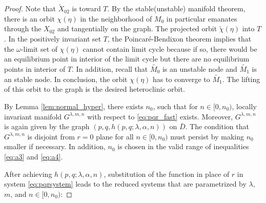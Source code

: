 \documentclass[a4paper,11pt]{article}
\begin{document}
\begin{proof}





Note that $\tilde{X}_{02}$ is toward $T$. By the stable(unstable) manifold theorem, there is an orbit $\chi(\eta)$ in the neighborhood of $M_0$ in particular emanates through the ${X}_{02}$ and tangentially on the graph. The projected orbit $\tilde{\chi}(\eta)$ into $T$. In the positively invariant set $T$, the Poincar\'e-Bendixon theorem implies that the $\omega$-limit set of $\chi(\eta)$ cannot contain limit cycle because if so, there would be an equilibrium point in interior of the limit cycle but there are no equilibrium points in interior of $T$. In addition, recall that $\tilde{M_0}$ is an unstable node and $\tilde{M_1}$ is an stable node. In conclusion, the orbit $\chi(\eta)$ has to converge to $\tilde{M_1}$. The lifting of this orbit to the graph is the desired heteroclinic orbit.






By Lemma \ref{lem:normal_hyper}, there exists $n_0$, such that for $n \in [0, n_0)$, locally invariant manifold $G^{\lambda,m,n}$ with respect to \eqref{eq:pqr_fast} exists. Moreover,   $G^{\lambda,m,n}$ is again given by the graph $(p,q,h(p,q;\lambda,\alpha,n))$ on $\bar{D}$. The condition that $G^{\lambda,m,n}$ is disjoint from $r=0$ plane for all $n \in [0, n_0)$ must persist by making $n_0$ smaller if necessary. In addition, $n_0$ is chosen in the valid range of inequalities \eqref{eq:a3} and \eqref{eq:a4}.%

After achieving $h(p,q;\lambda,\alpha,n)$, substitution of the function in place of $r$ in system \eqref{eq:pqrsystem} leads to  the reduced systems that are parametrized by $\lambda$, $m$, and $n\in[0,n_0)$:



\end{proof}
\end{document}
